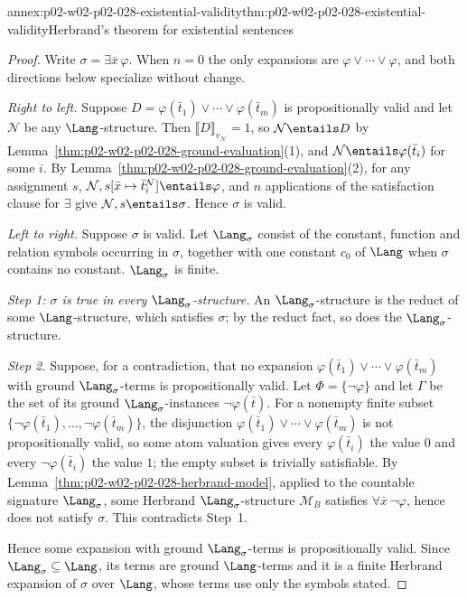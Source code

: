 \begin{annexitem}{annex:p02-w02-p02-028-existential-validity}{thm:p02-w02-p02-028-existential-validity}{Herbrand's theorem for existential sentences}
\begin{proof}
Write \(\sigma=\exists\bar x\,\varphi\).  When \(n=0\) the only expansions
are \(\varphi\lor\cdots\lor\varphi\), and both directions below specialize
without change.

\emph{Right to left.}  Suppose
\(D=\varphi(\bar t_1)\lor\cdots\lor\varphi(\bar t_m)\) is propositionally
valid and let \(\mathcal N\) be any \(\Lang\)-structure.  Then
\(\llbracket D\rrbracket_{v_{\mathcal N}}=1\), so
\(\mathcal N\entails D\) by
Lemma~\ref{thm:p02-w02-p02-028-ground-evaluation}(1), and
\(\mathcal N\entails\varphi(\bar t_i)\) for some \(i\).  By
Lemma~\ref{thm:p02-w02-p02-028-ground-evaluation}(2), for any assignment
\(s\), \(\mathcal N,s[\bar x\mapsto\bar t_i^{\mathcal N}]\entails\varphi\),
and \(n\) applications of the satisfaction clause for \(\exists\) give
\(\mathcal N,s\entails\sigma\).  Hence \(\sigma\) is valid.

\emph{Left to right.}  Suppose \(\sigma\) is valid.  Let \(\Lang_\sigma\)
consist of the constant, function and relation symbols occurring in
\(\sigma\), together with one constant \(c_0\) of \(\Lang\) when \(\sigma\)
contains no constant.  \(\Lang_\sigma\) is finite.

\emph{Step 1: \(\sigma\) is true in every \(\Lang_\sigma\)-structure.}  An
\(\Lang_\sigma\)-structure is the reduct of some \(\Lang\)-structure, which
satisfies \(\sigma\); by the reduct fact, so does the
\(\Lang_\sigma\)-structure.

\emph{Step 2.}  Suppose, for a contradiction, that no expansion
\(\varphi(\bar t_1)\lor\cdots\lor\varphi(\bar t_m)\) with ground
\(\Lang_\sigma\)-terms is propositionally valid.  Let \(\Phi=\{\neg\varphi\}\)
and let \(\Gamma\) be the set of its ground \(\Lang_\sigma\)-instances
\(\neg\varphi(\bar t)\).  For a nonempty finite subset
\(\{\neg\varphi(\bar t_1),\ldots,\neg\varphi(\bar t_m)\}\), the disjunction
\(\varphi(\bar t_1)\lor\cdots\lor\varphi(\bar t_m)\) is not propositionally
valid, so some atom valuation gives every \(\varphi(\bar t_i)\) the value
\(0\) and every \(\neg\varphi(\bar t_i)\) the value \(1\); the empty subset
is trivially satisfiable.  By
Lemma~\ref{thm:p02-w02-p02-028-herbrand-model}, applied to the countable
signature \(\Lang_\sigma\), some Herbrand \(\Lang_\sigma\)-structure
\(\mathcal M_B\) satisfies \(\forall\bar x\,\neg\varphi\), hence does not
satisfy \(\sigma\).  This contradicts Step~1.

Hence some expansion with ground \(\Lang_\sigma\)-terms is propositionally
valid.  Since \(\Lang_\sigma\subseteq\Lang\), its terms are ground
\(\Lang\)-terms and it is a finite Herbrand expansion of \(\sigma\) over
\(\Lang\), whose terms use only the symbols stated.
\end{proof}
\end{annexitem}

